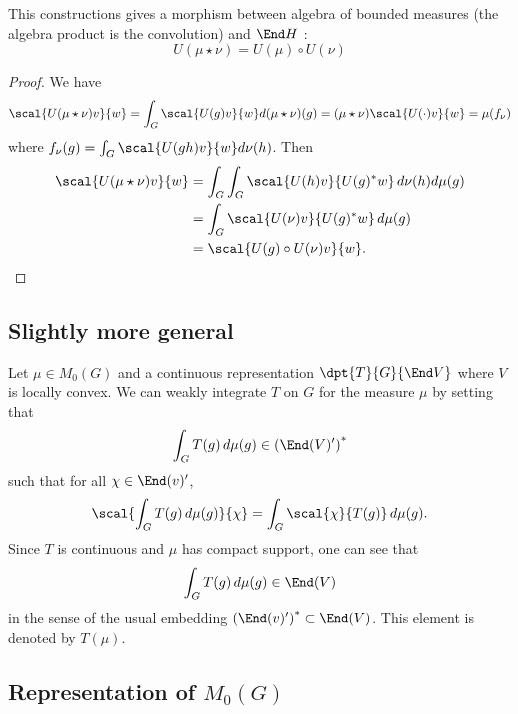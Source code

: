 \begin{proposition}

This constructions gives a morphism between algebra of bounded measures (the algebra product is the convolution) and $\End H$ :
\begin{equation}
  U( \mu\star\nu)=U(\mu)\circ U(\nu)
\end{equation}

\end{proposition}


\begin{proof}
We have
\begin{equation}
\scal{U(\mu\star\nu)v}{w}=\int_G \scal{U(g)v}{w}d(\mu\star\nu)(g)
		=(\mu\star\nu)\scal{U(\cdot)v}{w}
		=\mu(f_{\nu})
\end{equation}
where $f_{\nu}(g)=\int_G\scal{U(gh)v}{w}d\nu(h)$. Then
\begin{equation}
\begin{split}
\scal{U(\mu\star\nu)v}{w}&=\int_G\int_G \scal{U(h)v}{U(g)^*w}\,d\nu(h)d\mu(g)\\
		&=\int_G\scal{U(\nu)v}{U(g)^*w}\,d\mu(g)\\
		&=\scal{U(g)\circ U(\nu)v}{w}.
\end{split}
\end{equation}
\end{proof}

\subsection{Slightly more general}

Let $\mu\in M_0(G)$ and a continuous representation $\dpt{T}{G}{\End V}$ where $V$ is locally convex. We can weakly integrate $T$ on $G$ for the measure $\mu$ by setting that 
\[ 
  \int_G T(g)\,d\mu(g)\in\left( \End(V)' \right)^*
\]
such that for all $\chi\in\End(v)'$,
\begin{equation}
\scal{\int_G T(g)\,d\mu(g)}{\chi}=\int_G\scal{\chi}{T(g)}\,d\mu(g).
\end{equation}
Since $T$ is continuous and $\mu$ has compact support, one can see that
\[ 
  \int_GT(g)\,d\mu(g)\in\End(V)
\]
in the sense of the usual embedding $\left( \End(v)' \right)^*\subset\End(V)$. This element is denoted by $T(\mu)$.

\subsection{Representation of \texorpdfstring{$M_0(G)$}{M0G}}

